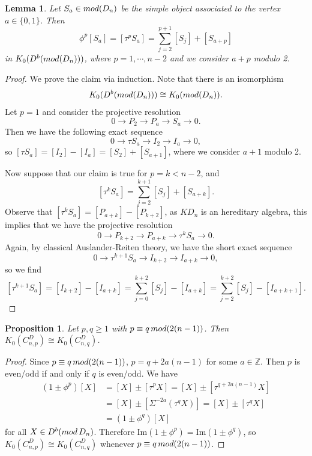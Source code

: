 \documentclass[a4paper,reqno,11pt]{amsart}
\newtheorem{lemma}[theorem]{Lemma}
\newtheorem{proposition}[theorem]{Proposition}
\theoremstyle{definition}
\renewcommand{\mod}{\mathop{\rm mod}\nolimits}%
\begin{document}
\begin{lemma}\label{simple1}
Let $S_a\in\mod(D_n)$ be the simple object associated to the vertex $a\in\{0,1\}$. Then
$$\phi^p[S_a]=[\tau^pS_a]=\sum_{j=2}^{p+1} [S_j]+[S_{a+p}]$$
in $K_0(D^b(\mod(D_n)))$, where $p=1,\cdots,n-2$ and we consider $a+p$ modulo 2.
\end{lemma}
\begin{proof}
We prove the claim via induction. Note that there is an isomorphism
$$K_0(D^b(\mod(D_n)))\cong K_0(\mod(D_n)).$$
Let $p=1$ and consider the projective resolution
$$0\rightarrow P_2\rightarrow P_a\rightarrow S_a\rightarrow 0.$$
Then we have the following exact sequence
$$0\rightarrow \tau S_a\rightarrow I_2\rightarrow I_a\rightarrow 0,$$
so $[\tau S_a]=[I_2]-[I_a]=[S_2]+[S_{a+1}]$, where we consider $a+1$ modulo 2.

Now suppose that our claim is true for $p=k<n-2$, and
$$[\tau^k S_a]=\sum_{j=2}^{k+1} [S_j]+[S_{a+k}].$$
Observe that $[\tau^k S_a]=[P_{a+k}]-[P_{k+2}]$, as $KD_n$ is an hereditary algebra, this implies that we have the projective resolution
$$0\rightarrow P_{k+2}\rightarrow P_{a+k}\rightarrow \tau^k S_a\rightarrow 0.$$
Again, by classical Auslander-Reiten theory, we have the short exact sequence
$$0\rightarrow \tau^{k+1} S_a\rightarrow I_{k+2}\rightarrow I_{a+k}\rightarrow 0,$$
so we find
$$[\tau^{k+1} S_a]=[I_{k+2}]-[I_{a+k}]=\sum_{j=0}^{k+2} [S_j]-[I_{a+k}]=\sum_{j=2}^{k+2} [S_j]-[I_{a+k+1}].$$
\end{proof}

\begin{proposition}\label{DLem: p,q equiv}
	Let $p,q \geq 1$ with $p \equiv q \mod (2(n-1))$.
Then $K_0(C_{n,p}^D) \cong K_0(C_{n,q}^D)$.
\end{proposition}

\begin{proof}
Since $p \equiv q \mod (2(n-1))$,  $p = q +2a(n-1)$ for some $a \in \mathbb{Z}$. Then $p$ is even/odd if and only if $q$ is even/odd.
We have
$$
\begin{aligned}
(1\pm \phi^p)[X] &= [X] \pm [\tau^p X] = [X] \pm [\tau^{q + 2a(n-1)}X]\\
 &= [X] \pm [\Sigma^{-2a} (\tau^q X)] = [X] \pm [\tau^q X] \\
 &= (1 \pm \phi^q)[X]
\end{aligned}
$$
for all $X \in D^b(\mod {D_n})$.
Therefore $\mathrm{Im}(1 \pm \phi^p) = \mathrm{Im}(1 \pm \phi^q)$, so $K_0(C_{n,p}^D) \cong K_0(C_{n,q}^D)$ whenever $p \equiv q \mod (2(n-1))$.
\end{proof}
\end{document}
